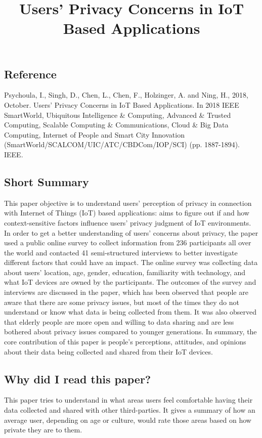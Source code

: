 \documentclass[11pt,a4paper]{article}
\title{Users' Privacy Concerns in IoT Based Applications}
\author{}
\date{}
\begin{document}
\maketitle

\subsection*{Reference}
Psychoula, I., Singh, D., Chen, L., Chen, F., Holzinger, A. and Ning, H., 2018, October. Users' Privacy Concerns in IoT Based Applications. In 2018 IEEE SmartWorld, Ubiquitous Intelligence \& Computing, Advanced \& Trusted Computing, Scalable Computing \& Communications, Cloud \& Big Data Computing, Internet of People and Smart City Innovation (SmartWorld/SCALCOM/UIC/ATC/CBDCom/IOP/SCI) (pp. 1887-1894). IEEE.

\subsection*{Short Summary} 
This paper objective is to understand users’ perception of privacy in connection with Internet of Things (IoT) based applications: aims to figure out if and how context-sensitive factors influence users’ privacy judgment of IoT environments. In order to get a better understanding of users’ concerns about privacy, the paper used a public online survey to collect information from 236 participants all over the world and contacted 41 semi-structured interviews to better investigate different factors that could have an impact. The online survey was collecting data about users’ location, age, gender, education, familiarity with technology, and what IoT devices are owned by the participants. The outcomes of the survey and interviews are discussed in the paper, which has been observed that people are aware that there are some privacy issues, but most of the times they do not understand or know what data is being collected from them. It was also observed that elderly people are more open and willing to data sharing and are less bothered about privacy issues compared to younger generations. In summary, the core contribution of this paper is people’s perceptions, attitudes, and opinions about their data being collected and shared from their IoT devices. 

\subsection*{Why did I read this paper?}
This paper tries to understand in what areas users feel comfortable having their data collected and shared with other third-parties. It gives a summary of how an average user, depending on age or culture, would rate those areas based on how private they are to them. 
\end{document}
